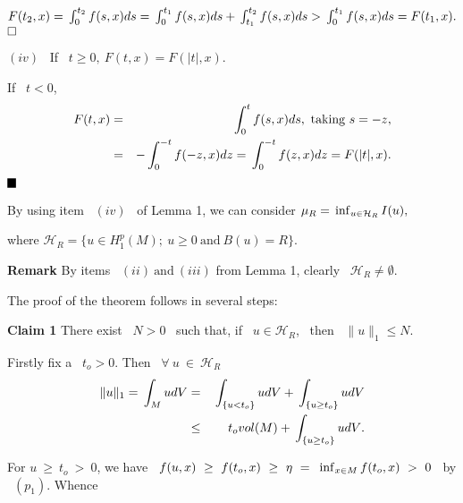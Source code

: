 \documentclass[12pt]{article}
\begin{document}
$F(t_2,x) = {\displaystyle}\int^{t_2}_0{f(s,x)ds} = {\displaystyle}\int^{t_1}_0{f(s,x)ds} + {\displaystyle}\int^{t_2}_{t_1}{f(s,x)ds} > 
{\displaystyle}\int^{t_1}_0{f(s,x)ds} = F(t_1,x).$ {$\hfill{\Box}$}

\noindent  $(iv)$ \ If \ $t \geq 0, \ F(t,x) = F(|t|,x).$

\noindent  If \ $t < 0$,
\vspace{-0.5mm}
\begin{eqnarray*} 
F(t,x) & = & {\displaystyle}\int^t_0{f(s,x)ds}, \ \mbox{taking} \ s = - z, \\
       & = & - {\displaystyle}\int^{- t}_0{f(- z,x)dz} = {\displaystyle}\int^{- t}_0{f(z,x)dz} = F(|t|,x).
\end{eqnarray*}       
{$\hfill{\rule{2.5mm}{2.5mm}}$}


By using item \ $(iv)$ \ of Lemma 1, we can consider  
$\mu_R = {\displaystyle}\inf_{u \in \mathcal{H}_R}{I(u)},$ 

\noindent  where 
$\mathcal{H}_R  = \{u \in H^p_1(M); \ u \geq 0 \ \mbox{and} \ B(u) = R \}.$

{\bf Remark}
By items \ $(ii) \ \mbox{and} \ (iii)$ from Lemma 1, clearly \ $\mathcal{H}_R \neq \emptyset$.

The proof of the theorem follows in several steps:

{\bf Claim 1}
There exist \ $N > 0$ \ such that, if \ $u \in \mathcal{H}_R$, \ then \ $\|u\|_1 \leq N$.

Firstly fix a \ $t_o > 0$. Then \ $\forall \ u \ \in \ \mathcal{H}_R$
\vspace{-0.5mm}
\begin{eqnarray*}
\|u\|_1 = {\displaystyle}\int_M{u dV} & = & {\displaystyle}\int_{\{u < t_o\}}{u dV} + {\displaystyle}\int_{\{u \geq t_o\}}{u dV} \\
   & \leq & t_o vol(M) + {\displaystyle}\int_{\{u \geq t_o\}}{u dV}.
\end{eqnarray*}   

\noindent  For $u \ \geq \ t_o \ > \ 0$, we have \ $f(u,x)\ \geq \ f(t_o,x) \ \geq \ \eta \
 = \ {\displaystyle}\inf_{x \in M}{f(t_o,x)} \ > \ 0$ \ by \ $(p_1)$. Whence 
\vspace{-0.8cm}
\end{document}
